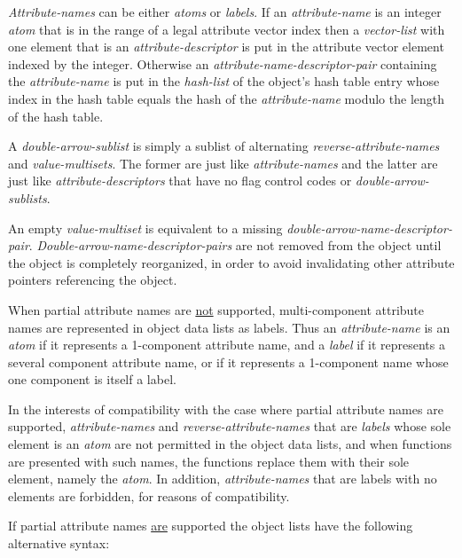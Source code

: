 \documentclass[12pt]{article}
\begin{document}
{\em Attribute-names} can be either {\em atoms} or {\em labels}.
If an {\em attribute-name} is an integer {\em atom}
that is in the range of a legal
attribute vector index then a {\em vector-list} with one element that is
an {\em attribute-descriptor}
is put in the attribute vector element
indexed by the integer.
Otherwise an {\em attribute-name-descriptor-pair} containing
the {\em attribute-name} is put
in the {\em hash-list} of the object's hash table entry whose index
in the hash table
equals the hash of the {\em attribute-name} modulo the length of the
hash table.

A {\em double-arrow-sublist} is 
simply a sublist of alternating {\em reverse-attribute-names}
and {\em value-multisets}.  The former are just like {\em attribute-names}
and the latter are just like {\em attribute-descriptors} that have no
flag control codes or {\em double-arrow-sublists}.

An empty {\em value-multiset} is equivalent to a missing
{\em double-arrow-name-descriptor-pair}.
{\em Dou\-ble-arrow-name-descriptor-pairs} are not
removed from the object until the object is completely reorganized,
in order to avoid invalidating other attribute pointers referencing the object.

When partial attribute names are \underline{not} supported, multi-component
attribute names are represented in object data lists as labels.
Thus an {\em attribute-name} is an {\em atom} if it represents a 1-component
attribute name, and a {\em label} if it represents a several component
attribute name, or if it represents a 1-component name whose one component
is itself a label.

In the interests of compatibility with the case where partial attribute
names are supported, {\em attribute-names} and {\em reverse-attribute-names}
that are {\em labels} whose sole element is an {\em atom} are not
permitted in the object data lists, and when functions are presented with
such names, the functions replace them with their sole element, namely the
{\em atom}.  In addition, {\em attribute-names} that are labels with no elements
are forbidden, for reasons of compatibility.

If partial attribute names \underline{are} supported
the object lists have the following alternative syntax:
\end{document}
